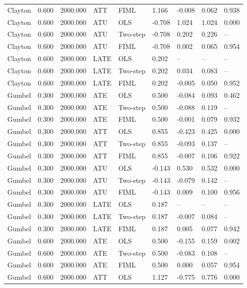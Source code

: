 \begin{table}[htbp]
\begin{tabular}{lllllllll}
Clayton & 0.600 & 2000.000 & ATT & FIML & 1.166 & -0.008 & 0.062 & 0.938 \\
Clayton & 0.600 & 2000.000 & ATU & OLS & -0.708 & 1.024 & 1.024 & 0.000 \\
Clayton & 0.600 & 2000.000 & ATU & Two-step & -0.708 & 0.202 & 0.226 & -- \\
Clayton & 0.600 & 2000.000 & ATU & FIML & -0.708 & 0.002 & 0.065 & 0.954 \\
Clayton & 0.600 & 2000.000 & LATE & OLS & 0.202 & -- & -- & -- \\
Clayton & 0.600 & 2000.000 & LATE & Two-step & 0.202 & 0.034 & 0.083 & -- \\
Clayton & 0.600 & 2000.000 & LATE & FIML & 0.202 & -0.005 & 0.050 & 0.952 \\
Gumbel & 0.300 & 2000.000 & ATE & OLS & 0.500 & -0.084 & 0.093 & 0.462 \\
Gumbel & 0.300 & 2000.000 & ATE & Two-step & 0.500 & -0.088 & 0.119 & -- \\
Gumbel & 0.300 & 2000.000 & ATE & FIML & 0.500 & -0.001 & 0.079 & 0.932 \\
Gumbel & 0.300 & 2000.000 & ATT & OLS & 0.855 & -0.423 & 0.425 & 0.000 \\
Gumbel & 0.300 & 2000.000 & ATT & Two-step & 0.855 & -0.093 & 0.137 & -- \\
Gumbel & 0.300 & 2000.000 & ATT & FIML & 0.855 & -0.007 & 0.106 & 0.922 \\
Gumbel & 0.300 & 2000.000 & ATU & OLS & -0.143 & 0.530 & 0.532 & 0.000 \\
Gumbel & 0.300 & 2000.000 & ATU & Two-step & -0.143 & -0.079 & 0.142 & -- \\
Gumbel & 0.300 & 2000.000 & ATU & FIML & -0.143 & 0.009 & 0.100 & 0.956 \\
Gumbel & 0.300 & 2000.000 & LATE & OLS & 0.187 & -- & -- & -- \\
Gumbel & 0.300 & 2000.000 & LATE & Two-step & 0.187 & -0.007 & 0.084 & -- \\
Gumbel & 0.300 & 2000.000 & LATE & FIML & 0.187 & 0.005 & 0.077 & 0.942 \\
Gumbel & 0.600 & 2000.000 & ATE & OLS & 0.500 & -0.155 & 0.159 & 0.002 \\
Gumbel & 0.600 & 2000.000 & ATE & Two-step & 0.500 & -0.083 & 0.108 & -- \\
Gumbel & 0.600 & 2000.000 & ATE & FIML & 0.500 & 0.000 & 0.057 & 0.954 \\
Gumbel & 0.600 & 2000.000 & ATT & OLS & 1.127 & -0.775 & 0.776 & 0.000 \\

\end{tabular}
\end{table}
